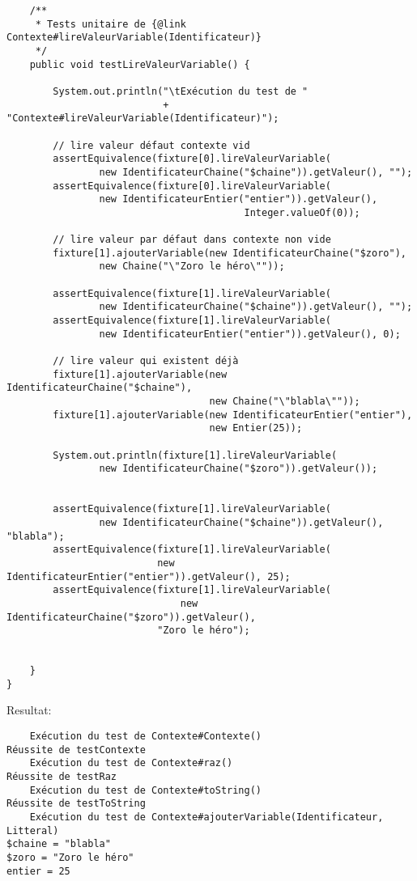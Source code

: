 \begin{enum}
\begin{verbatim}
    /**
     * Tests unitaire de {@link Contexte#lireValeurVariable(Identificateur)}
     */
    public void testLireValeurVariable() {

        System.out.println("\tExécution du test de "
                           + "Contexte#lireValeurVariable(Identificateur)");
        
        // lire valeur défaut contexte vid
        assertEquivalence(fixture[0].lireValeurVariable(
                new IdentificateurChaine("$chaine")).getValeur(), "");
        assertEquivalence(fixture[0].lireValeurVariable(
                new IdentificateurEntier("entier")).getValeur(), 
                                         Integer.valueOf(0));
        
        // lire valeur par défaut dans contexte non vide
        fixture[1].ajouterVariable(new IdentificateurChaine("$zoro"), 
                new Chaine("\"Zoro le héro\""));
        
        assertEquivalence(fixture[1].lireValeurVariable(
                new IdentificateurChaine("$chaine")).getValeur(), "");
        assertEquivalence(fixture[1].lireValeurVariable(
                new IdentificateurEntier("entier")).getValeur(), 0);
        
        // lire valeur qui existent déjà
        fixture[1].ajouterVariable(new IdentificateurChaine("$chaine"), 
                                   new Chaine("\"blabla\""));
        fixture[1].ajouterVariable(new IdentificateurEntier("entier"), 
                                   new Entier(25));
        
        System.out.println(fixture[1].lireValeurVariable(
                new IdentificateurChaine("$zoro")).getValeur());
        
        
        assertEquivalence(fixture[1].lireValeurVariable(
                new IdentificateurChaine("$chaine")).getValeur(), "blabla");
        assertEquivalence(fixture[1].lireValeurVariable(
                          new IdentificateurEntier("entier")).getValeur(), 25);
        assertEquivalence(fixture[1].lireValeurVariable(
                              new IdentificateurChaine("$zoro")).getValeur(), 
                          "Zoro le héro");

        
    }
}
\end{verbatim}
Resultat:
\begin{verbatim}
    Exécution du test de Contexte#Contexte()
Réussite de testContexte
    Exécution du test de Contexte#raz()
Réussite de testRaz
    Exécution du test de Contexte#toString()
Réussite de testToString
    Exécution du test de Contexte#ajouterVariable(Identificateur, Litteral)
$chaine = "blabla"
$zoro = "Zoro le héro"
entier = 25


\end{verbatim}
\end{enum}
